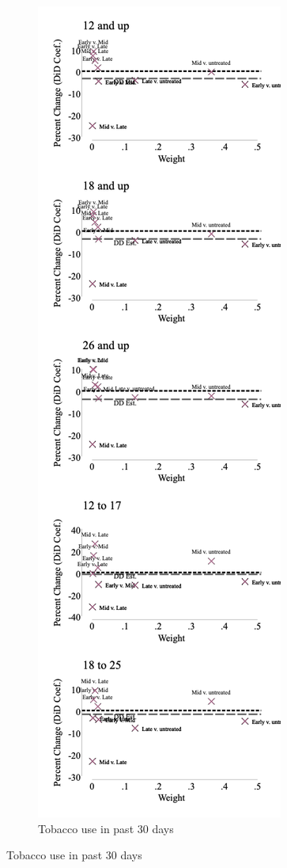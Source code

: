 \documentclass[12pt]{article}%
\begin{document}
\begin{figure}
\begin{minipage}{.9\linewidth}
\begin{subfigure}[b]{0.32\columnwidth}
    \label{fig:bacon_lead_lag_alc_30}
  \end{subfigure}
  \hfill %
  \begin{subfigure}[b]{0.32\columnwidth}
      \caption{\scriptsize{Tobacco use in past 30 days}}
    \includegraphics[width=\linewidth]{../output/plots/bacon_weights_ln_tob_use_30.png}

\end{subfigure}
\end{minipage}
\end{figure}
\end{document}
